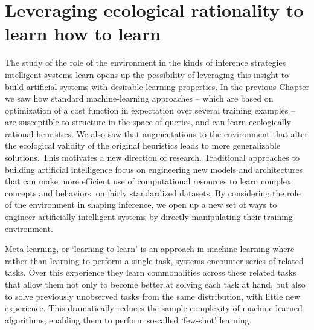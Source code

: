 \chapter{Leveraging ecological rationality to learn how to learn}
\label{chap:causal}

The study of the role of the environment in the kinds of inference strategies intelligent systems learn opens up the possibility of leveraging this insight to build artificial systems with desirable learning properties. In the previous Chapter we saw how standard machine-learning approaches -- which are based on optimization of a cost function in expectation over several training examples -- are susceptible to structure in the space of queries, and can learn ecologically rational heuristics. We also saw that augmentations to the environment that alter the ecological validity of the original heuristics leads to more generalizable solutions. This motivates a new direction of research. Traditional approaches to building artificial intelligence focus on engineering new models and architectures that can make more efficient use of computational resources to learn complex concepts and behaviors, on fairly standardized datasets. By considering the role of the environment in shaping inference, we open up a new set of ways to engineer artificially intelligent systems by directly manipulating their training environment.

Meta-learning, or `learning to learn'\cite{schmidhuber1987evolutionary, thrun2012learning} is an approach in machine-learning where rather than learning to perform a single task, systems encounter series of related tasks. Over this experience they learn commonalities across these related tasks that allow them not only to become better at solving each task at hand, but also to solve previously unobserved tasks from the same distribution, with little new experience. This dramatically reduces the sample complexity of machine-learned algorithms, enabling them to perform so-called `few-shot' learning\citep{vinyals2016matching, ravi2016optimization}.

